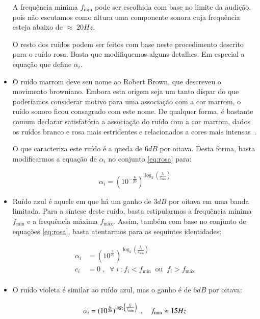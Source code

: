 \begin{itemize}
A frequência mínima $f_{\text{min}}$ pode ser escolhida com base no limite da audição, pois não escutamos como altura uma componente sonora cuja frequência esteja abaixo de $\approx\; 20Hz$.

O resto dos ruídos podem ser feitos com base neste procedimento descrito para 
o ruído rosa. Basta que modifiquemos alguns detalhes. Em especial a equação que define $\alpha_i$.

\item O ruído marrom deve seu nome ao Robert Brown, que descreveu o movimento browniano.
Embora esta origem seja um tanto díspar do que poderíamos considerar motivo para uma associação com a cor marrom, o ruído sonoro ficou consagrado com este nome. De qualquer forma, é bastante comum declarar satisfatória a associação do ruído com a cor marrom, dados os ruídos branco e rosa mais estridentes e relacionados a cores mais intensas~\cite{marrom}.

O que caracteriza este ruído é a queda de $6dB$ por oitava. Desta forma, basta modificarmos a equação de $\alpha_i$ 
no conjunto \ref{eq:rosa} para:

\begin{equation}\label{eq:marrom}
\alpha_i=(10^{-\frac{6}{20}})^{\log _2 \left( \frac{f_i}{f_{\text{min}}} \right )}
\end{equation}

\item Ruído azul é aquele em que há um ganho de $3dB$ por oitava em uma banda limitada. Para
a síntese deste ruído, basta estipularmos a frequência mínima $f_{\text{min}}$ e a frequência
máxima $f_{\text{máx}}$. Assim, também com base no conjunto de equações \ref{eq:rosa}, 
basta atentarmos para as sequintes identidades:

\begin{equation}\label{eq:azul}
\begin{split}
\alpha_i & = (10^{\frac{3}{20}})^{\log _2 \left ( \frac{f_i}{f_{\text{min}}} \right )} \\
c_i & =0\;,\;\; \forall \; i \; : f_i<f_{\text{min}} \;\; \text{ou} \;\; f_i>f_{\text{máx}} \\
\end{split}
\end{equation}

\item O ruído violeta é similar ao ruído azul, mas o ganho é de $6dB$ por oitava:

\begin{equation}\label{eq:violeta}
\alpha_i = (10^{\frac{6}{20}})^{\log _2 \left ( \frac{f_i}{f_{\text{min}}} \right )} \;\;, \quad f_{\text{min}} \approx 15 Hz \\
\end{equation}


\end{itemize}
